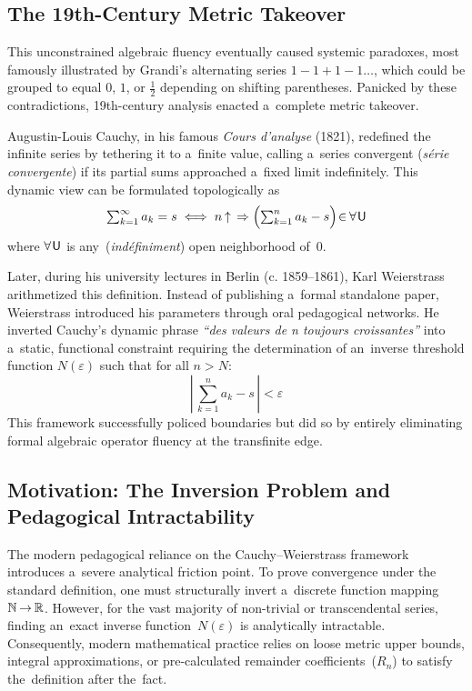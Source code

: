\documentclass[11pt,a4paper]{article}
\newcommand\fex{\hspace{.2ex}} %
\newcommand\nfex{\hspace{-0.2ex}} %
\newcommand\cin{\nfex\in\nfex}
\newcommand\cto{\nfex\to\nfex}
\theoremstyle{definition}
\theoremstyle{noperiod}
\begin{document}
\subsection{The 19th-Century Metric Takeover}

This unconstrained algebraic fluency eventually caused systemic paradoxes, most famously illustrated by Grandi's alternating series $1 - 1 + 1 - 1 \dots$, which could be grouped to equal $0$, $1$, or $\frac{1}{2}$ depending on shifting parentheses. Panicked by these contradictions, 19th-century analysis enacted a~complete metric takeover.

Augustin-Louis Cauchy, in his famous \textit{Cours d'analyse} (1821), redefined the infinite series by tethering it to a~finite value, calling a~series convergent (\textit{série convergente}) if its partial sums approached a~fixed limit indefinitely. This dynamic view can be formulated topologically as
\begin{equation}
\textstyle\sum_{k=1}^{\infty} a_k = s \iff n \nfex\uparrow \:\: \Rightarrow \Bigl( \textstyle\sum_{k=1}^{n} a_k - s \Bigr) \nfex\cin \forall\fex \mathsf{U}
\end{equation}
where ${\forall\fex \mathsf{U}}$ is any~(\textit{indéfiniment}) open neighborhood of~$0$.

Later, during his university lectures in Berlin (c. 1859–1861), Karl Weierstrass arithmetized this definition. Instead of publishing a~formal standalone paper, Weierstrass introduced his parameters through oral pedagogical networks. He inverted Cauchy's dynamic phrase \textit{``des valeurs de n toujours croissantes''} into a~static, functional constraint requiring the determination of an~inverse threshold function $N(\varepsilon)$ such that for all $n > N$:
\begin{equation}
\left|\, \sum_{k=1}^{n} a_k - s \,\right| < \varepsilon
\end{equation}
This framework successfully policed boundaries but did so by entirely eliminating formal algebraic operator fluency at the transfinite edge.

\subsection{Motivation: The Inversion Problem and Pedagogical Intractability}

The modern pedagogical reliance on the Cauchy--Weierstrass framework introduces a~severe analytical friction point. To prove convergence under the standard definition, one must structurally invert a~discrete function mapping $\mathbb{N} \cto \mathbb{R}$. However, for the vast majority of non-trivial or transcendental series, finding an~exact inverse function~$N(\varepsilon)$ is analytically intractable. Consequently, modern mathematical practice relies on loose metric upper bounds, integral approximations, or pre-calculated remainder coefficients~($R_n$) to satisfy the~definition after the~fact.
\end{document}
